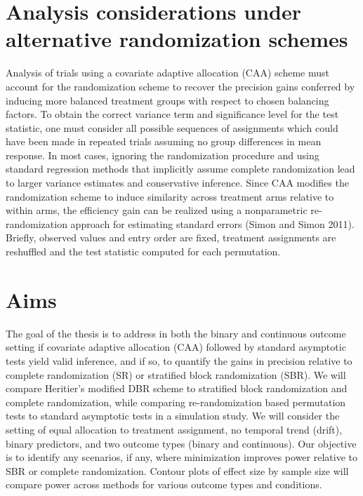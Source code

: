 \section{Analysis considerations under alternative randomization schemes}
Analysis of trials using a covariate adaptive allocation (CAA) scheme must account for the randomization scheme to recover the precision gains conferred by inducing more balanced treatment groups with respect to chosen balancing factors.  
To obtain the correct variance term and significance level for the test statistic, one must consider all possible sequences of assignments which could have been made in repeated trials assuming no group differences in mean response.  
In most cases, ignoring the randomization procedure and using standard regression methods that implicitly assume complete randomization lead to larger variance estimates and conservative inference. 
Since CAA modifies the randomization scheme to induce similarity across treatment arms relative to within arms, the efficiency gain can be realized using a nonparametric re-randomization approach for estimating standard errors (Simon and Simon 2011).  
Briefly, observed values and entry order are fixed, treatment assignments are reshuffled and the test statistic computed for each permutation.  

\section{Aims}
The goal of the thesis is to address in both the binary and continuous outcome setting if covariate adaptive allocation (CAA) followed by standard asymptotic tests yield valid inference, and if so, to quantify the gains in precision relative to complete randomization (SR) or stratified block randomization (SBR).  
We will compare Heritier’s modified DBR scheme to stratified block randomization and complete randomization, while comparing re-randomization based permutation tests to standard asymptotic tests in a simulation study.  
We will consider the setting of equal allocation to treatment assignment, no temporal trend (drift), binary predictors, and two outcome types (binary and continuous).  
Our objective is to identify any scenarios, if any, where minimization improves power relative to SBR or complete randomization. 
Contour plots of effect size by sample size will compare power across methods for various outcome types and conditions. 


